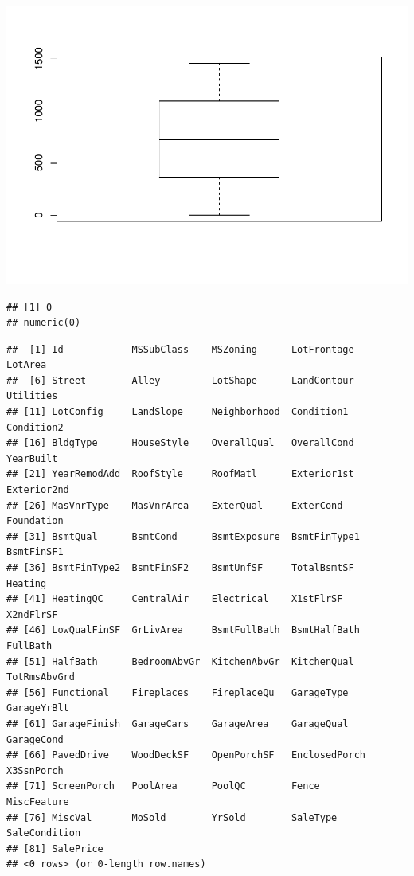 \documentclass[]{article}
\begin{document}
\includegraphics{EDA_files/figure-latex/unnamed-chunk-23-1.pdf}

\begin{verbatim}
## [1] 0
## numeric(0)
\end{verbatim}

\begin{verbatim}
##  [1] Id            MSSubClass    MSZoning      LotFrontage   LotArea      
##  [6] Street        Alley         LotShape      LandContour   Utilities    
## [11] LotConfig     LandSlope     Neighborhood  Condition1    Condition2   
## [16] BldgType      HouseStyle    OverallQual   OverallCond   YearBuilt    
## [21] YearRemodAdd  RoofStyle     RoofMatl      Exterior1st   Exterior2nd  
## [26] MasVnrType    MasVnrArea    ExterQual     ExterCond     Foundation   
## [31] BsmtQual      BsmtCond      BsmtExposure  BsmtFinType1  BsmtFinSF1   
## [36] BsmtFinType2  BsmtFinSF2    BsmtUnfSF     TotalBsmtSF   Heating      
## [41] HeatingQC     CentralAir    Electrical    X1stFlrSF     X2ndFlrSF    
## [46] LowQualFinSF  GrLivArea     BsmtFullBath  BsmtHalfBath  FullBath     
## [51] HalfBath      BedroomAbvGr  KitchenAbvGr  KitchenQual   TotRmsAbvGrd 
## [56] Functional    Fireplaces    FireplaceQu   GarageType    GarageYrBlt  
## [61] GarageFinish  GarageCars    GarageArea    GarageQual    GarageCond   
## [66] PavedDrive    WoodDeckSF    OpenPorchSF   EnclosedPorch X3SsnPorch   
## [71] ScreenPorch   PoolArea      PoolQC        Fence         MiscFeature  
## [76] MiscVal       MoSold        YrSold        SaleType      SaleCondition
## [81] SalePrice    
## <0 rows> (or 0-length row.names)
\end{verbatim}
\end{document}
